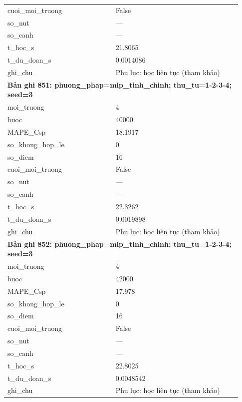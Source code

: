 \begin{longtable}{p{0.43\linewidth}p{0.50\linewidth}}
cuoi\_\allowbreak moi\_\allowbreak truong & False \\
so\_\allowbreak nut & — \\
so\_\allowbreak canh & — \\
t\_\allowbreak hoc\_\allowbreak s & 21.8065 \\
t\_\allowbreak du\_\allowbreak doan\_\allowbreak s & 0.0014086 \\
ghi\_\allowbreak chu & Phụ lục: học liên tục (tham khảo) \\
\midrule
\multicolumn{2}{p{0.95\linewidth}}{\textbf{Bản ghi 851: phuong\_phap=mlp\_tinh\_chinh; thu\_tu=1-2-3-4; seed=3}} \\
moi\_\allowbreak truong & 4 \\
buoc & 40000 \\
MAPE\_\allowbreak Csp & 18.1917 \\
so\_\allowbreak khong\_\allowbreak hop\_\allowbreak le & 0 \\
so\_\allowbreak diem & 16 \\
cuoi\_\allowbreak moi\_\allowbreak truong & False \\
so\_\allowbreak nut & — \\
so\_\allowbreak canh & — \\
t\_\allowbreak hoc\_\allowbreak s & 22.3262 \\
t\_\allowbreak du\_\allowbreak doan\_\allowbreak s & 0.0019898 \\
ghi\_\allowbreak chu & Phụ lục: học liên tục (tham khảo) \\
\midrule
\multicolumn{2}{p{0.95\linewidth}}{\textbf{Bản ghi 852: phuong\_phap=mlp\_tinh\_chinh; thu\_tu=1-2-3-4; seed=3}} \\
moi\_\allowbreak truong & 4 \\
buoc & 42000 \\
MAPE\_\allowbreak Csp & 17.978 \\
so\_\allowbreak khong\_\allowbreak hop\_\allowbreak le & 0 \\
so\_\allowbreak diem & 16 \\
cuoi\_\allowbreak moi\_\allowbreak truong & False \\
so\_\allowbreak nut & — \\
so\_\allowbreak canh & — \\
t\_\allowbreak hoc\_\allowbreak s & 22.8025 \\
t\_\allowbreak du\_\allowbreak doan\_\allowbreak s & 0.0048542 \\
ghi\_\allowbreak chu & Phụ lục: học liên tục (tham khảo) \\

\end{longtable}
